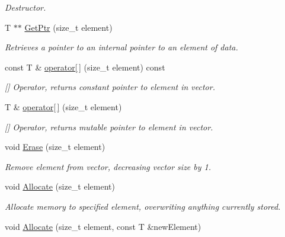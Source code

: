 \begin{DoxyCompactItemize}
\begin{DoxyCompactList}\small\item\em Destructor. \item\end{DoxyCompactList}\item 
T $\ast$$\ast$ \hyperlink{class_store_vector_aeec5fd589a16e7a45a948af2379db827}{GetPtr} (size\_\-t element)
\begin{DoxyCompactList}\small\item\em Retrieves a pointer to an internal pointer to an element of data. \item\end{DoxyCompactList}\item 
const T \& \hyperlink{class_store_vector_a796742994f7986fdd32690e5c8bf9764}{operator\mbox{[}$\,$\mbox{]}} (size\_\-t element) const 
\begin{DoxyCompactList}\small\item\em \mbox{[}\mbox{]} Operator, returns constant pointer to element in vector. \item\end{DoxyCompactList}\item 
T \& \hyperlink{class_store_vector_afaf386a296ca40706ead91846b309fc5}{operator\mbox{[}$\,$\mbox{]}} (size\_\-t element)
\begin{DoxyCompactList}\small\item\em \mbox{[}\mbox{]} Operator, returns mutable pointer to element in vector. \item\end{DoxyCompactList}\item 
void \hyperlink{class_store_vector_a754d17030ea9000df2fe8cd6157fd428}{Erase} (size\_\-t element)
\begin{DoxyCompactList}\small\item\em Remove element from vector, decreasing vector size by 1. \item\end{DoxyCompactList}\item 
void \hyperlink{class_store_vector_a0793ae4989a4b0e91f8b472b97f09e1f}{Allocate} (size\_\-t element)
\begin{DoxyCompactList}\small\item\em Allocate memory to specified element, overwriting anything currently stored. \item\end{DoxyCompactList}\item 
void \hyperlink{class_store_vector_ae2630e9cae56ede6a70ad9c194fde987}{Allocate} (size\_\-t element, const T \&newElement)
$$
\end{DoxyCompactItemize}
